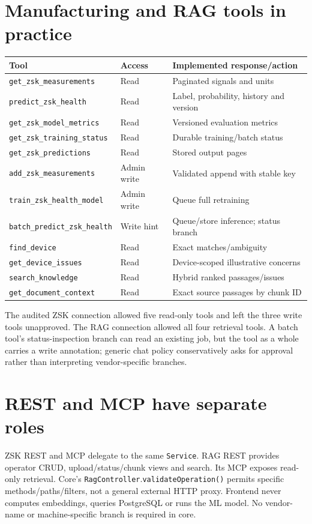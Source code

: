 \section{Manufacturing and RAG tools in practice}
\par\smallskip\noindent\begin{tabularx}{\linewidth}{@{}p{.48\linewidth}lX@{}}\toprule
Tool & Access & Implemented response/action\\\midrule
\texttt{get\_zsk\_measurements} & Read & Paginated signals and units\\
\texttt{predict\_zsk\_health} & Read & Label, probability, history and version\\
\texttt{get\_zsk\_model\_metrics} & Read & Versioned evaluation metrics\\
\texttt{get\_zsk\_training\_status} & Read & Durable training/batch status\\
\texttt{get\_zsk\_predictions} & Read & Stored output pages\\
\texttt{add\_zsk\_measurements} & Admin write & Validated append with stable key\\
\texttt{train\_zsk\_health\_model} & Admin write & Queue full retraining\\
\texttt{batch\_predict\_zsk\_health} & Write hint & Queue/store inference; status branch\\\midrule
\texttt{find\_device} & Read & Exact matches/ambiguity\\
\texttt{get\_device\_issues} & Read & Device-scoped illustrative concerns\\
\texttt{search\_knowledge} & Read & Hybrid ranked passages/issues\\
\texttt{get\_document\_context} & Read & Exact source passages by chunk ID\\\bottomrule
\end{tabularx}\par\smallskip
The audited ZSK connection allowed five read-only tools and left the three write tools unapproved. The RAG connection allowed all four retrieval tools. A batch tool's status-inspection branch can read an existing job, but the tool as a whole carries a write annotation; generic chat policy conservatively asks for approval rather than interpreting vendor-specific branches.
\section{REST and MCP have separate roles}
ZSK REST and MCP delegate to the same \texttt{Service}. RAG REST provides operator CRUD, upload/status/chunk views and search. Its MCP exposes read-only retrieval. Core's \texttt{RagController}\allowbreak.\texttt{validateOperation()} permits specific methods/paths/filters, not a general external HTTP proxy. Frontend never computes embeddings, queries PostgreSQL or runs the ML model. No vendor-name or machine-specific branch is required in core.
